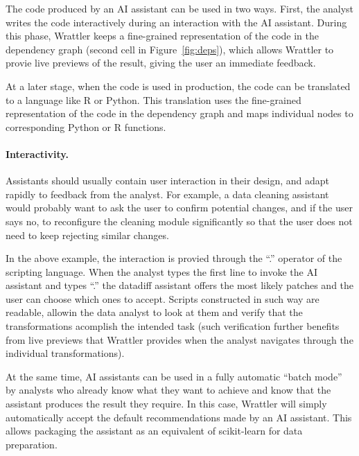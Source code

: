 \documentclass[sigplan,preprint,10pt]{acmart}\settopmatter{printfolios=true,printccs=false,printacmref=false}
\theoremstyle{plain}
\theoremstyle{definition}
\begin{document}
The code produced by an AI assistant can be used in two ways. First, the analyst writes the code
interactively during an interaction with the AI assistant. During this phase, Wrattler 
keeps a fine-grained representation of the code in the dependency graph (second cell in 
Figure~\ref{fig:deps}), which allows Wrattler to provie live previews of the result, giving the
user an immediate feedback.

At a later stage, when the code is used in production, the code can be translated to a language
like R or Python. This translation uses the fine-grained representation of the code in the 
dependency graph and maps individual nodes to corresponding Python or R functions.

\paragraph{Interactivity.}

Assistants should usually contain user interaction in their design, and adapt rapidly to feedback 
from the analyst. For example, a data cleaning assistant would probably want to ask the user to 
confirm potential changes, and if the user says no, to reconfigure the cleaning module 
significantly so that the user does not need to keep rejecting similar changes. 

In the above example, the interaction is provied through the ``.'' operator of the scripting
language. When the analyst types the first line to invoke the AI assistant and types ``.''
the datadiff assistant offers the most likely patches and the user can choose which ones
to accept. Scripts constructed in such way are readable, allowin the data analyst to look at them
and verify that the transformations acomplish the intended task (such verification further
benefits from live previews that Wrattler provides when the analyst navigates through the
individual transformations).

At the same time, AI assistants can be used in a fully automatic ``batch mode'' by analysts 
who already know what they want to achieve and know that the assistant produces the result they
require. In this case, Wrattler will simply automatically accept the default recommendations made
by an AI assistant. This allows packaging the assistant as an equivalent of scikit-learn for 
data preparation.
\end{document}
